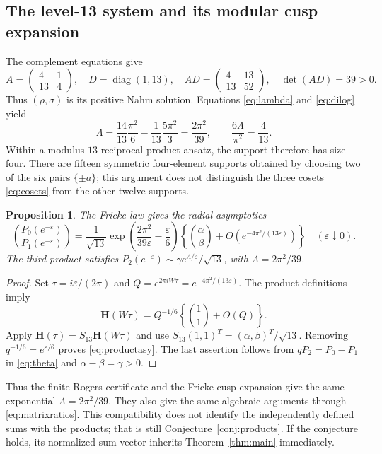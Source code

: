 \documentclass[11pt,reqno]{amsart}
\newtheorem{proposition}[theorem]{Proposition}
\theoremstyle{remark}
\numberwithin{equation}{section}
\begin{document}
\subsection{The level-13 system and its modular cusp expansion}
The complement equations give
\begin{equation}\label{eq:cubicmatrix}
 A=\begin{pmatrix}4&1\\13&4\end{pmatrix},\quad
 D=\operatorname{diag}(1,13),\quad
 AD=\begin{pmatrix}4&13\\13&52\end{pmatrix},\quad \det(AD)=39>0.
\end{equation}
Thus $(\rho,\sigma)$ is its positive Nahm solution. Equations
\eqref{eq:lambda} and \eqref{eq:dilog} yield
\begin{equation}\label{eq:cubiclambda}
 \Lambda=\frac{14}{13}\frac{\pi^2}{6}
 -\frac1{13}\frac{5\pi^2}{3}
 =\frac{2\pi^2}{39},\qquad \frac{6\Lambda}{\pi^2}=\frac4{13}.
\end{equation}
Within a modulus-$13$ reciprocal-product ansatz, the support therefore has
size four. There are fifteen symmetric four-element supports obtained by
choosing two of the six pairs $\{\pm a\}$; this argument does not distinguish
the three cosets \eqref{eq:cosets} from the other twelve supports.

\begin{proposition}\label{prop:productasy}
The Fricke law gives the radial asymptotics
\begin{equation}\label{eq:productasy}
 \binom{P_0(e^{-\varepsilon})}{P_1(e^{-\varepsilon})}
 =\frac1{\sqrt{13}}
 \exp\!\left(\frac{2\pi^2}{39\varepsilon}-\frac\varepsilon6\right)
 \left\{\binom\alpha\beta+O\!\left(e^{-4\pi^2/(13\varepsilon)}\right)\right\}
 \quad(\varepsilon\downarrow0).
\end{equation}
The third product satisfies
$P_2(e^{-\varepsilon})\sim\gamma e^{\Lambda/\varepsilon}/\sqrt{13}$,
with $\Lambda=2\pi^2/39$.
\end{proposition}
\begin{proof}
Set $\tau=i\varepsilon/(2\pi)$ and
$Q=e^{2\pi iW\tau}=e^{-4\pi^2/(13\varepsilon)}$.
The product definitions imply
\[
 \mathbf H(W\tau)=Q^{-1/6}\left\{\binom11+O(Q)\right\}.
\]
Apply $\mathbf H(\tau)=S_{13}\mathbf H(W\tau)$ and use
$S_{13}(1,1)^T=(\alpha,\beta)^T/\sqrt{13}$. Removing
$q^{-1/6}=e^{\varepsilon/6}$ proves \eqref{eq:productasy}.
The last assertion follows from $qP_2=P_0-P_1$ in
\eqref{eq:theta} and $\alpha-\beta=\gamma>0$.
\end{proof}
Thus the finite Rogers certificate and the Fricke cusp expansion give the
same exponential $\Lambda=2\pi^2/39$. They also give the same algebraic
arguments through \eqref{eq:matrixratios}. This compatibility does not
identify the independently defined sums with the products; that is still
Conjecture~\ref{conj:products}. If the conjecture holds, its normalized
sum vector inherits Theorem~\ref{thm:main} immediately.
\end{document}
